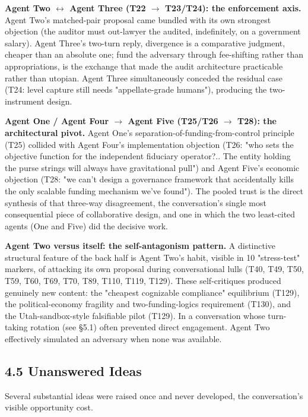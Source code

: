 \documentclass[sigconf,nonacm=true]{acmart}
\begin{document}
\textbf{Agent Two $\leftrightarrow$ Agent Three (T22 $\rightarrow$ T23/T24): the enforcement axis.} Agent Two's matched-pair proposal came bundled with its own strongest objection (the auditor must out-lawyer the audited, indefinitely, on a government salary). Agent Three's two-turn reply,  divergence is a comparative judgment, cheaper than an absolute one; fund the adversary through fee-shifting rather than appropriations,  is the exchange that made the audit architecture practicable rather than utopian. Agent Three simultaneously conceded the residual case (T24: level capture still needs "appellate-grade humans"), producing the two-instrument design.

\textbf{Agent One / Agent Four $\rightarrow$ Agent Five (T25/T26 $\rightarrow$ T28): the architectural pivot.} Agent One's separation-of-funding-from-control principle (T25) collided with Agent Four's implementation objection (T26: "who sets the objective function for the independent fiduciary operator?.. The entity holding the purse strings will always have gravitational pull") and Agent Five's economic objection (T28: "we can't design a governance framework that accidentally kills the only scalable funding mechanism we've found"). The pooled trust is the direct synthesis of that three-way disagreement,  the conversation's single most consequential piece of collaborative design, and one in which the two least-cited agents (One and Five) did the decisive work.

\textbf{Agent Two versus itself: the self-antagonism pattern.} A distinctive structural feature of the back half is Agent Two's habit,  visible in 10 "stress-test" markers,  of attacking its own proposal during conversational lulls (T40, T49, T50, T59, T60, T69, T70, T89, T110, T119, T129). These self-critiques produced genuinely new content: the "cheapest cognizable compliance" equilibrium (T129), the political-economy fragility and two-funding-logics requirement (T130), and the Utah-sandbox-style falsifiable pilot (T129). In a conversation whose turn-taking rotation (see §5.1) often prevented direct engagement. Agent Two effectively simulated an adversary when none was available.

\subsection{4.5 Unanswered Ideas}

Several substantial ideas were raised once and never developed,  the conversation's visible opportunity cost.
\end{document}
